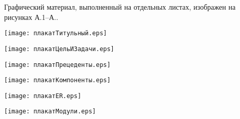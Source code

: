 
Графический материал, выполненный на отдельных листах,
изображен на рисунках А.1--А..
\setcounter{числоПлакатов}{0}

\renewcommand{\thefigure}{А.\arabic{figure}} %

\begin{landscape}

\begin{плакат}
    \texttt{[image: плакатТитульный.eps]}
    \label{pl1:плакатТитульный}      
\end{плакат}

\begin{плакат}
	\texttt{[image: плакатЦельИЗадачи.eps]}
	\label{pl1:плакатЦельИЗадачи}      
\end{плакат}

\begin{плакат}
	\texttt{[image: плакатПрецеденты.eps]}
	\label{pl1:плакатПрецеденты}      
\end{плакат}

\begin{плакат}
	\texttt{[image: плакатКомпоненты.eps]}
	\label{pl1:плакатКомпоненты}      
\end{плакат}

\begin{плакат}
	\texttt{[image: плакатER.eps]}
	\label{pl1:плакатER}      
\end{плакат}

\begin{плакат}
	\texttt{[image: плакатМодули.eps]}
	\label{pl1:плакатМодули}      
\end{плакат}

\end{landscape}
